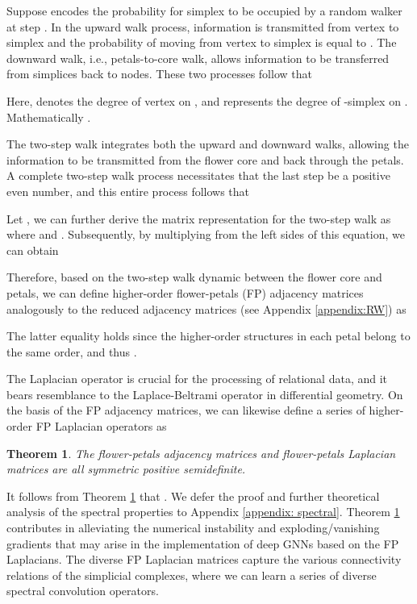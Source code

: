 \documentclass[letterpaper]{article} \usepackage{aaai24}
\theoremstyle{plain}
\newtheorem{theorem}{Theorem}[section]
\theoremstyle{definition}
\theoremstyle{remark}
\begin{document}
Suppose  encodes the probability for simplex  to be occupied by a random walker at step .
In the upward walk process, information is transmitted from vertex to simplex and the probability of moving from vertex  to simplex  is equal to . 
The downward walk, i.e., petals-to-core walk, allows information to be transferred from simplices back to nodes. These two processes follow that

Here,    denotes the degree of vertex  on , and  represents the degree of -simplex  on  . Mathematically .



The two-step walk  integrates both the upward and downward walks, allowing the information to be transmitted from the flower core and back through the petals. 
A complete two-step walk process necessitates that the last step be a positive even number, and this entire  process follows that



Let , we can further derive the matrix representation for the two-step walk as 
where  and .
Subsequently, by multiplying  from the left sides of this equation, we can obtain

    

Therefore, based on the two-step walk dynamic between the flower core and petals, we can define higher-order flower-petals (FP) adjacency matrices analogously to the reduced adjacency matrices (see Appendix \ref{appendix:RW}) as

The latter equality holds since the higher-order structures in each petal belong to the same order, and thus . 


The Laplacian operator is crucial for the processing of relational data, and it bears resemblance to the Laplace-Beltrami operator in differential geometry.
On the basis of the FP adjacency matrices, we can likewise define a series of higher-order FP Laplacian operators as

   



\begin{theorem}
\label{theorem: semi-positive}
The flower-petals adjacency matrices  and flower-petals Laplacian matrices  are all symmetric positive semidefinite.
\end{theorem}

It follows from Theorem \ref{theorem: semi-positive} that .
We defer the proof and further theoretical analysis of the spectral properties to Appendix \ref{appendix: spectral}.
Theorem \ref{theorem: semi-positive} contributes in  alleviating the numerical instability and exploding/vanishing gradients that may arise in the implementation of deep GNNs based on the FP Laplacians.
The diverse FP Laplacian matrices capture the various connectivity relations of the simplicial complexes, where we can learn a series of diverse spectral convolution operators.
\end{document}
